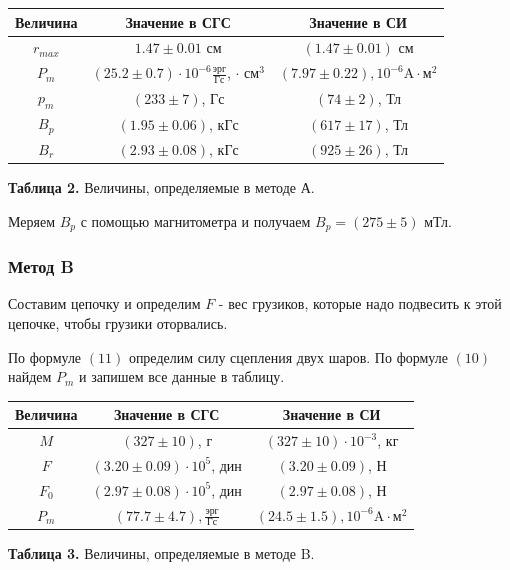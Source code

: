 \documentclass{article}
\begin{document}
\begin{center}
    \begin{tabular}{|c|c|c|}
        \hline
        Величина & Значение в СГС & Значение в СИ \\
        \hline
        $r_{max}$ & \(1.47 \pm 0.01\) см & \((1.47 \pm 0.01)\) см \\
        \hline
        $P_m$ & \((25.2 \pm 0.7) \cdot 10^{-6} \frac{\text{эрг}}{\text{Гс}}\), $\cdot$ см$^3$ & \((7.97 \pm 0.22), 10^{-6} \text{A} \cdot \text{м}^{2}\)\\
        \hline
        $p_m$ & \((233 \pm 7)\), Гс & \((74 \pm 2)\), Тл \\
        \hline
        $B_p$ & \((1.95 \pm 0.06)\), кГс & \((617 \pm 17)\), Тл \\
        \hline
        $B_r$ & \((2.93 \pm 0.08)\), кГс & \((925 \pm 26)\), Тл \\
        \hline
    \end{tabular}
    
    \textbf{Таблица 2.} Величины, определяемые в методе А.
\end{center}

Меряем $B_p$ с помощью магнитометра и получаем $B_p = (275 \pm 5)$ мТл.

\subsubsection*{Метод B}

Составим цепочку и определим $F$ - вес грузиков, которые надо подвесить к этой цепочке, чтобы грузики оторвались. 

По формуле $(11)$ определим силу сцепления двух шаров. По формуле $(10)$ найдем $P_m$ и запишем все данные в таблицу.

\begin{center}
    \begin{tabular}{|c|c|c|}
    \hline
        Величина & Значение в СГС & Значение в СИ\\
        \hline
        $M$ & \((327 \pm 10)\), г & \((327 \pm 10) \cdot 10^{-3}\), кг \\
        \hline
        $F$ & \((3.20 \pm 0.09) \cdot 10^{5}\), дин & \((3.20 \pm 0.09) \), Н \\
        \hline
        $F_0$ & \((2.97 \pm 0.08) \cdot 10^{5}\), дин & \((2.97 \pm 0.08)\), Н \\
        \hline
        $P_m$ & \((77.7 \pm 4.7), \frac{\text{эрг}}{\text{Гс}}\) & \((24.5 \pm 1.5), 10^{-6} \text{A} \cdot \text{м}^{2}\) \\
        \hline
    \end{tabular}
    
    \textbf{Таблица 3.} Величины, определяемые в методе B.
\end{center}
\end{document}

